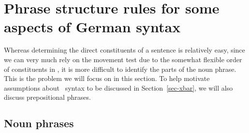

\section{Phrase structure rules for some aspects of German syntax}

Whereas determining the direct constituents of a sentence is relatively easy, since we can very much rely on the movement test due to the
somewhat flexible order of constituents in , it is more difficult to identify the parts of the noun phrase. This is the problem
we will focus on in this section. To help motivate assumptions about \xbar~syntax to be discussed in Section~\ref{sec-xbar},
we will also discuss prepositional phrases.


\subsection{Noun phrases}
\label{sec-psg-np}

